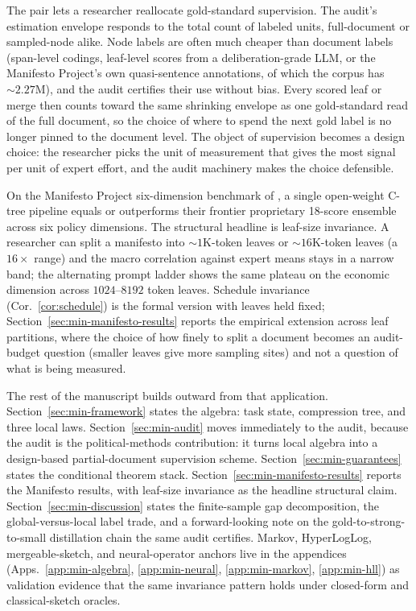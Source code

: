 The pair lets a researcher reallocate gold-standard supervision. The
audit's estimation envelope responds to the total count of labeled
units, full-document or sampled-node alike. Node labels are often much
cheaper than document labels (span-level codings, leaf-level scores
from a deliberation-grade LLM, or the Manifesto Project's own
quasi-sentence annotations, of which the corpus has $\sim\!2.27$M),
and the audit certifies their use without bias. Every scored leaf or
merge then counts toward the same shrinking envelope as one
gold-standard read of the full document, so the choice of where to
spend the next gold label is no longer pinned to the document level.
The object of supervision becomes a design choice: the researcher
picks the unit of measurement that gives the most signal per unit of
expert effort, and the audit machinery makes the choice defensible.

On the Manifesto Project six-dimension benchmark of
\citet{BenoitEtAl2025}, a single open-weight C-tree pipeline equals or
outperforms their frontier proprietary 18-score ensemble across six
policy dimensions.
The structural headline is leaf-size invariance. A researcher can split a
manifesto into $\sim\!1\mathrm{K}$-token leaves or
$\sim\!16\mathrm{K}$-token leaves (a $16\times$ range) and the macro
correlation against expert means stays in a narrow band; the
alternating prompt ladder shows the same plateau on the economic
dimension across $1024$--$8192$ token leaves. Schedule invariance
(Cor.~\ref{cor:schedule}) is the formal version with leaves held fixed;
Section~\ref{sec:min-manifesto-results} reports the empirical extension
across leaf partitions, where the choice of how finely to split a
document becomes an audit-budget question (smaller leaves give more
sampling sites) and not a question of what is being measured.

The rest of the manuscript builds outward from that application.
Section~\ref{sec:min-framework} states the algebra: task state,
compression tree, and three local laws. Section~\ref{sec:min-audit}
moves immediately to the audit, because the audit is the political-methods
contribution: it turns local algebra into a design-based
partial-document supervision scheme. Section~\ref{sec:min-guarantees}
states the conditional theorem stack.
Section~\ref{sec:min-manifesto-results} reports the Manifesto results,
with leaf-size invariance as the headline structural claim.
Section~\ref{sec:min-discussion} states the finite-sample gap
decomposition, the global-versus-local label trade, and a forward-looking
note on the gold-to-strong-to-small distillation chain the same audit
certifies. Markov, HyperLogLog, mergeable-sketch, and neural-operator
anchors live in the appendices (Apps.~\ref{app:min-algebra},
\ref{app:min-neural}, \ref{app:min-markov}, \ref{app:min-hll}) as
validation evidence that the same invariance pattern holds under
closed-form and classical-sketch oracles.
